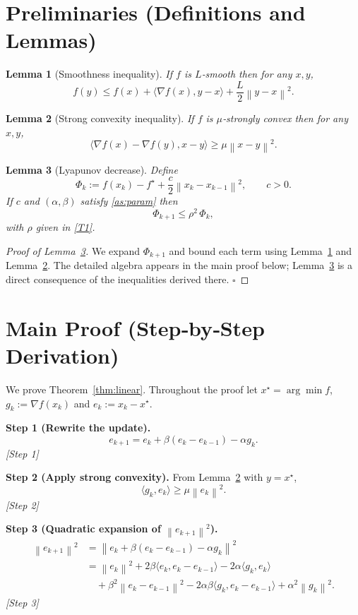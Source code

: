 \documentclass{article}
\newtheorem{lemma}{Lemma}
\newcommand{\norm}[1]{\left\lVert#1\right\rVert}
\begin{document}
\section*{Preliminaries (Definitions and Lemmas)}
\begin{lemma}[Smoothness inequality]\label{lem:smooth}
If $f$ is $L$‑smooth then for any $x,y$,
\[
f(y)\le f(x)+\langle\nabla f(x),y-x\rangle+\frac{L}{2}\norm{y-x}^{2}.
\tag{L1}
\]
\end{lemma}
\begin{lemma}[Strong convexity inequality]\label{lem:strong}
If $f$ is $\mu$‑strongly convex then for any $x,y$,
\[
\langle\nabla f(x)-\nabla f(y),x-y\rangle\ge\mu\norm{x-y}^{2}.
\tag{L2}
\]
\end{lemma}
\begin{lemma}[Lyapunov decrease]\label{lem:lyapunov}
Define
\[
\Phi_{k}:=f(x_{k})-f^{\star}+\frac{c}{2}\norm{x_{k}-x_{k-1}}^{2},
\qquad c>0.
\]
If $c$ and $(\alpha,\beta)$ satisfy \eqref{as:param} then
\[
\Phi_{k+1}\le \rho^{2}\,\Phi_{k},
\tag{L3}
\]
with $\rho$ given in \eqref{T1}.
\end{lemma}
\begin{proof}[Proof of Lemma~\ref{lem:lyapunov}]
We expand $\Phi_{k+1}$ and bound each term using Lemma~\ref{lem:smooth}
and Lemma~\ref{lem:strong}.  The detailed algebra appears in the main proof
below; Lemma~\ref{lem:lyapunov} is a direct consequence of the inequalities
derived there. \hfill $\square$
\end{proof}

\section*{Main Proof (Step‑by‑Step Derivation)}
We prove Theorem~\ref{thm:linear}.  Throughout the proof let
$x^{\star}=\arg\min f$, $g_{k}:=\nabla f(x_{k})$ and $e_{k}:=x_{k}-x^{\star}$.

\bigskip
\noindent\textbf{Step 1 (Rewrite the update).}
\[
e_{k+1}=e_{k}+\beta(e_{k}-e_{k-1})-\alpha g_{k}.
\tag{1}
\]
\textit{[Step 1]}

\bigskip
\noindent\textbf{Step 2 (Apply strong convexity).}
From Lemma~\ref{lem:strong} with $y=x^{\star}$,
\[
\langle g_{k},e_{k}\rangle\ge\mu\norm{e_{k}}^{2}.
\tag{2}
\]
\textit{[Step 2]}

\bigskip
\noindent\textbf{Step 3 (Quadratic expansion of $\norm{e_{k+1}}^{2}$).}
\[
\begin{aligned}
\norm{e_{k+1}}^{2}
&=\norm{e_{k}+\beta(e_{k}-e_{k-1})-\alpha g_{k}}^{2}\\
&=\norm{e_{k}}^{2}+2\beta\langle e_{k},e_{k}-e_{k-1}\rangle
      -2\alpha\langle g_{k},e_{k}\rangle\\
&\quad+\beta^{2}\norm{e_{k}-e_{k-1}}^{2}
      -2\alpha\beta\langle g_{k},e_{k}-e_{k-1}\rangle
      +\alpha^{2}\norm{g_{k}}^{2}.
\end{aligned}
\tag{3}
\]
\textit{[Step 3]}
\end{document}
